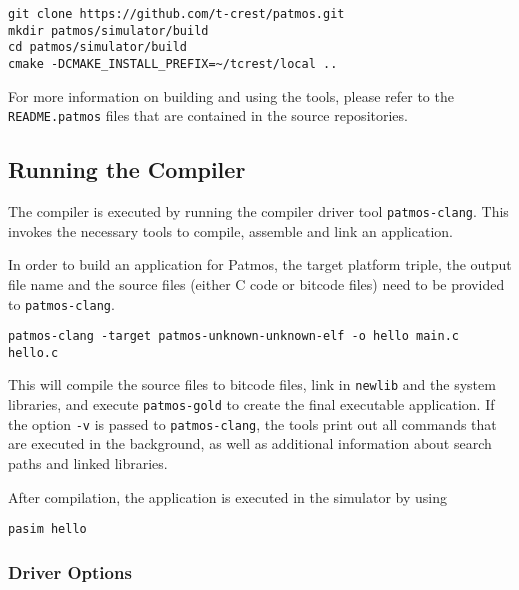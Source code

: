 \begin{verbatim}
git clone https://github.com/t-crest/patmos.git
mkdir patmos/simulator/build
cd patmos/simulator/build
cmake -DCMAKE_INSTALL_PREFIX=~/tcrest/local ..
\end{verbatim}


For more information on building and using the tools, please refer to the \texttt{README.patmos} files 
that are contained in the source repositories.


\subsection{Running the Compiler}


The compiler is executed by running the compiler driver tool \texttt{patmos-clang}. This invokes the 
necessary tools to compile, assemble and link an application. 

In order to build an application for Patmos, the target platform triple, the output file name and the source files (either C code or bitcode files) 
need to be provided to \texttt{patmos-clang}.

\begin{verbatim}
patmos-clang -target patmos-unknown-unknown-elf -o hello main.c hello.c
\end{verbatim}

This will compile the source files to bitcode files, link in \texttt{newlib} and the system libraries,
and execute \texttt{patmos-gold} to create the final executable application. If the option \texttt{-v} is passed
to \texttt{patmos-clang}, the tools print out all commands that are executed in the background, as well as additional information
about search paths and linked libraries.

After compilation, the application is executed in the simulator by using

\begin{verbatim}
pasim hello
\end{verbatim}

\subsubsection{Driver Options}

